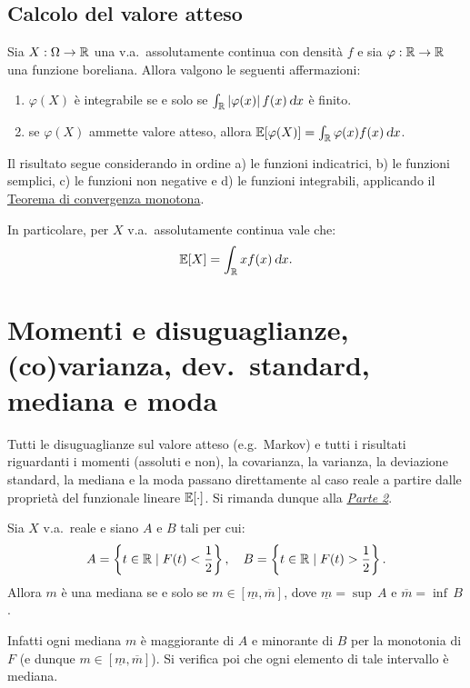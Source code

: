 \begin{multicols*}{2}
\subsection{Calcolo del valore atteso}

\begin{proposition}
    Sia $X : \Omega \to \mathbb{R}$ una v.a.~assolutamente continua con densità $f$
    e sia $\varphi : \mathbb{R} \to \mathbb{R}$ una funzione
    boreliana. Allora valgono le seguenti affermazioni:
    \begin{enumerate}[(i.)]
        \item $\varphi(X)$ è integrabile se e solo se $\int_\RR \abs{\varphi(x)} f(x) \dx$ è finito.
        \item se $\varphi(X)$ ammette valore atteso, allora $\EE[\varphi(X)] = \int_\RR \varphi(x) f(x) \dx$.
    \end{enumerate}
    Il risultato segue considerando in ordine a) le funzioni indicatrici, b) le funzioni semplici,
    c) le funzioni non negative e d) le funzioni integrabili, applicando il
    \hyperref[th:convergenza_monotona]{Teorema di convergenza monotona}. 
\end{proposition}

\begin{remark}
    In particolare, per $X$ v.a.~assolutamente continua vale che:
    \[
        \EE[X] = \int_\RR x f(x) \dx.
    \]
\end{remark}

\section{Momenti e disuguaglianze, (co)varianza, dev.~standard, mediana e moda}

Tutti le disuguaglianze sul valore atteso (e.g.~Markov) e tutti i risultati
riguardanti i momenti (assoluti e non), la covarianza, la varianza, la
deviazione standard, la mediana e la moda passano direttamente al
caso reale a partire dalle proprietà del funzionale lineare
$\mathbb{E}[\cdot]$. Si rimanda dunque alla \hyperref[sec:momenti_assoluti]{\textit{Parte 2}}.

\begin{proposition}
    Sia $X$ v.a.~reale e siano $A$ e $B$ tali per cui:
    \[
        A = \left\{t \in \mathbb{R} \mid F(t) < \frac{1}{2} \right\}, \quad B = \left\{t \in \mathbb{R} \mid F(t) > \frac{1}{2} \right\}.
    \]
    Allora $m$ è una mediana se e solo se $m \in [\underline{m}, \overline{m}]$, dove $\underline{m} = \sup \, A$ e
    $\overline{m} = \inf \, B$. \smallskip

    
    Infatti ogni mediana $m$ è maggiorante di $A$ e minorante di $B$ per la monotonia di
    $F$ (e dunque $m \in [\underline{m}, \overline{m}]$). Si verifica poi che ogni elemento
    di tale intervallo è mediana.
\end{proposition}

\end{multicols*}